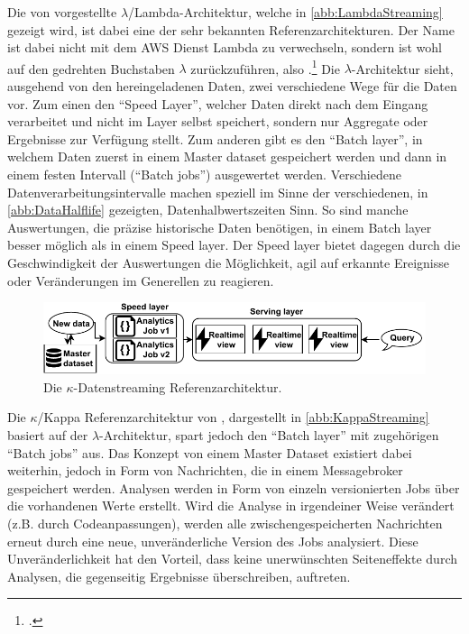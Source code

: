 Die von \citeauthor{Marz.2015} vorgestellte $\lambda$/Lambda-Architektur, welche in \autoref{abb:LambdaStreaming} gezeigt wird, ist dabei eine der sehr bekannten Referenzarchitekturen. 
Der Name ist dabei nicht mit dem \ac{AWS} Dienst Lambda zu verwechseln, sondern ist wohl auf den gedrehten Buchstaben $\lambda$ zurückzuführen, also .\footcite[Vgl. auch im Folgenden][]{Berle.27.11.2017} Die $\lambda$-Architektur sieht, ausgehend von den hereingeladenen Daten, zwei verschiedene Wege für die Daten vor. 
Zum einen den \enquote{Speed Layer}, welcher Daten direkt nach dem Eingang verarbeitet und nicht im Layer selbst speichert, sondern nur Aggregate oder Ergebnisse zur Verfügung stellt. Zum anderen gibt es den \enquote{Batch layer}, in welchem Daten zuerst in einem Master dataset gespeichert werden und dann in einem festen Intervall (\enquote{Batch jobs}) ausgewertet werden. 
Verschiedene Datenverarbeitungsintervalle machen speziell im Sinne der verschiedenen, in \autoref{abb:DataHalflife} gezeigten, Datenhalbwertszeiten Sinn. So sind manche Auswertungen, die präzise historische Daten benötigen, in einem Batch layer besser möglich als in einem Speed layer. Der Speed layer bietet dagegen durch die Geschwindigkeit der Auswertungen die Möglichkeit, agil auf erkannte Ereignisse oder Veränderungen im Generellen zu reagieren.

\begin{figure}[H]
\centering
\includegraphics[width=\textwidth]{graphics/Kappa-Reference-Architecture.pdf}
\caption[Die $\kappa$-Datenstreaming Referenzarchitetktur]{Die $\kappa$-Datenstreaming Referenzarchitektur.\footnotemark}
\label{abb:KappaStreaming}
\end{figure}

Die $\kappa$/Kappa Referenzarchitektur von \citeauthor{Kreps.2014}, dargestellt in \autoref{abb:KappaStreaming} basiert auf der $\lambda$-Architektur, spart jedoch den \enquote{Batch layer} mit zugehörigen \enquote{Batch jobs} aus. 
Das Konzept von einem Master Dataset existiert dabei weiterhin, jedoch in Form von Nachrichten, die in einem Messagebroker gespeichert werden. Analysen werden in Form von einzeln versionierten Jobs über die vorhandenen Werte erstellt. 
Wird die Analyse in irgendeiner Weise verändert (z.B. durch Codeanpassungen), werden alle zwischengespeicherten Nachrichten erneut durch eine neue, unveränderliche Version des Jobs analysiert. Diese Unveränderlichkeit hat den Vorteil, dass keine unerwünschten Seiteneffekte durch Analysen, die gegenseitig Ergebnisse überschreiben, auftreten. 



